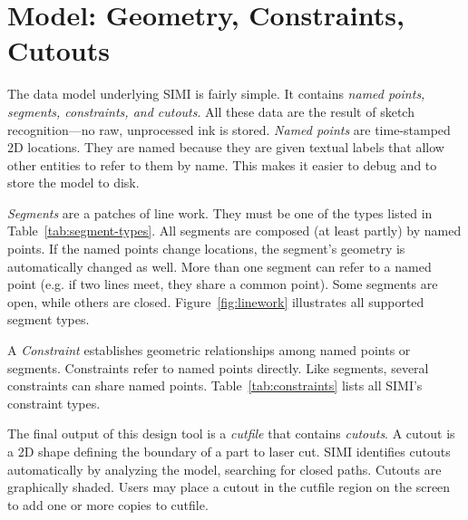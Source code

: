 

\section{Model: Geometry, Constraints, Cutouts}

The data model underlying SIMI is fairly simple. It contains
\textit{named points, segments, constraints, and cutouts}. All these
data are the result of sketch recognition---no raw, unprocessed ink is
stored. \textit{Named points} are time-stamped 2D locations. They are
named because they are given textual labels that allow other entities
to refer to them by name. This makes it easier to debug and to store
the model to disk. 

\textit{Segments} are a patches of line work. They must be one of the
types listed in Table~\ref{tab:segment-types}. All segments are
composed (at least partly) by named points. If the named points change
locations, the segment's geometry is automatically changed as
well. More than one segment can refer to a named point (e.g. if two
lines meet, they share a common point). Some segments are open, while
others are closed. Figure~\ref{fig:linework} illustrates all supported
segment types.


A \textit{Constraint} establishes geometric relationships among named
points or segments. Constraints refer to named points directly. Like
segments, several constraints can share named
points. Table~\ref{tab:constraints} lists all SIMI's constraint types.


The final output of this design tool is a \textit{cutfile} that
contains \textit{cutouts}. A cutout is a 2D shape defining the
boundary of a part to laser cut. SIMI identifies cutouts automatically
by analyzing the model, searching for closed paths. Cutouts are
graphically shaded. Users may place a cutout in the cutfile region on
the screen to add one or more copies to cutfile.

